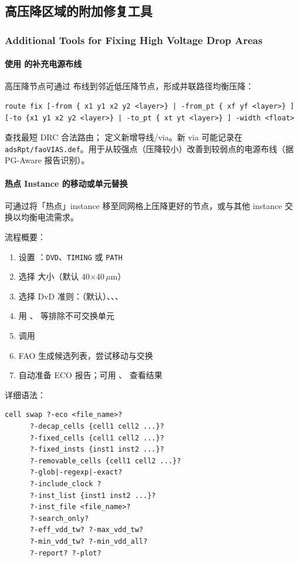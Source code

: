 \subsection{高压降区域的附加修复工具}
\subsubsection*{Additional Tools for Fixing High Voltage Drop Areas}

\paragraph{使用  的补充电源布线}
高压降节点可通过  布线到邻近低压降节点，形成并联路径均衡压降：
\begin{lstlisting}
route fix [-from { x1 y1 x2 y2 <layer>} | -from_pt { xf yf <layer>} ]
[-to {x1 y1 x2 y2 <layer>} | -to_pt { xt yt <layer>} ] -width <float>
\end{lstlisting}
查找最短 DRC 合法路由； 定义新增导线/via。新 via 可能记录在 \texttt{adsRpt/faoVIAS.def}。用于从较强点（压降较小）改善到较弱点的电源布线（据 PG-Aware 报告识别）。

\paragraph{热点 Instance 的移动或单元替换}
可通过将「热点」instance 移至同网格上压降更好的节点，或与其他 instance 交换以均衡电流需求。

 流程概要：
\begin{enumerate}
  \item 设置 ：\texttt{DVD}、\texttt{TIMING} 或 \texttt{PATH}
  \item 选择  大小（默认 40$\times$40\,$\mu$m）
  \item 选择 DvD 准则：（默认）、、、
  \item 用 、 等排除不可交换单元
  \item 调用 
  \item FAO 生成候选列表，尝试移动与交换
  \item 自动准备 ECO 报告；可用 、 查看结果
\end{enumerate}

 详细语法：
\begin{lstlisting}
cell swap ?-eco <file_name>?
      ?-decap_cells {cell1 cell2 ...}?
      ?-fixed_cells {cell1 cell2 ...}?
      ?-fixed_insts {inst1 inst2 ...}?
      ?-removable_cells {cell1 cell2 ...}?
      ?-glob|-regexp|-exact?
      ?-include_clock ?
      ?-inst_list {inst1 inst2 ...}?
      ?-inst_file <file_name>?
      ?-search_only?
      ?-eff_vdd_tw? ?-max_vdd_tw?
      ?-min_vdd_tw? ?-min_vdd_all?
      ?-report? ?-plot?
\end{lstlisting}


